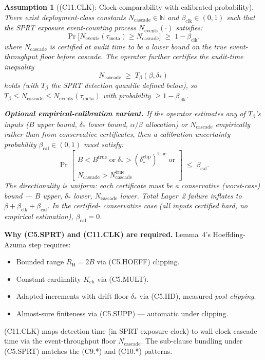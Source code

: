 \documentclass{article}
\newtheorem{assumption}{Assumption}
\newcommand{\deltastar}{\delta_{*}}
\newcommand{\Tbeta}{T_{\beta}}
\newcommand{\Ncasc}{N_{\mathrm{cascade}}}
\newcommand{\Nev}{N_{\mathrm{events}}}
\newcommand{\bclk}{\beta_{\mathrm{clk}}}
\newcommand{\bcal}{\beta_{\mathrm{cal}}}
\newcommand{\Bclip}{B}
\newcommand{\Rh}{R_{\mathrm{H}}}
\newcommand{\Kch}{K_{\mathrm{ch}}}
\begin{document}
\begin{assumption}[(C11.CLK): Clock comparability with calibrated probability]
\label{ass:C11CLK}
There exist deployment-class constants $\Ncasc \in \mathbb{N}$ and
$\bclk \in (0,1)$ such that the SPRT exposure event-counting process
$\Nev(\cdot)$ satisfies:
\[
  \Pr\bigl[\Nev(\tau_{\mathrm{meta}}) \geq \Ncasc\bigr] \;\geq\;
  1 - \bclk,
\]
where $\Ncasc$ is certified at audit time to be a \emph{lower bound}
on the true event-throughput floor before cascade.  The operator
further certifies the audit-time inequality
\[
  \Ncasc \;\geq\; \Tbeta(\beta, \deltastar)
\]
holds (with $\Tbeta$ the SPRT detection quantile defined below), so
$\Tbeta \leq \Ncasc \leq \Nev(\tau_{\mathrm{meta}})$ with probability
$\geq 1 - \bclk$.

\textbf{Optional empirical-calibration variant.}  If the operator
estimates any of $\Tbeta$'s inputs ($\Bclip$ upper bound,
$\deltastar$ lower bound, $\alpha/\beta$ allocation) or $\Ncasc$
empirically rather than from conservative certificates, then a
calibration-uncertainty probability $\bcal \in (0,1)$ must satisfy:
\[
  \Pr\!\left[
  \begin{array}{l}
  \Bclip < \Bclip^{\mathrm{true}} \;\text{or}\;
  \deltastar > (\delta_*^{\mathrm{clip}})^{\mathrm{true}}\;\text{or}\\
  \Ncasc > \Ncasc^{\mathrm{true}}
  \end{array}
  \right] \;\leq\; \bcal.
\]
The directionality is uniform: each certificate must be a
\emph{conservative} (worst-case) bound — $\Bclip$ \emph{upper},
$\deltastar$ \emph{lower}, $\Ncasc$ \emph{lower}.  Total Layer~2
failure inflates to $\beta + \bclk + \bcal$.  In the certified-
conservative case (all inputs certified hard, no empirical
estimation), $\bcal = 0$.
\end{assumption}

\textbf{Why (C5.SPRT) and (C11.CLK) are required.}  Lemma~4's
Hoeffding-Azuma step requires:
\begin{itemize}
\item Bounded range $\Rh = 2\Bclip$ via (C5.HOEFF) clipping.
\item Constant cardinality $\Kch$ via (C5.MULT).
\item Adapted increments with drift floor $\deltastar$ via (C5.IID),
  measured \emph{post-clipping}.
\item Almost-sure finiteness via (C5.SUPP) — automatic under
  clipping.
\end{itemize}
(C11.CLK) maps detection time (in SPRT exposure clock) to wall-clock
cascade time via the event-throughput floor $\Ncasc$.  The
sub-clause bundling under (C5.SPRT) matches the (C9.*) and (C10.*)
patterns.
\end{document}
